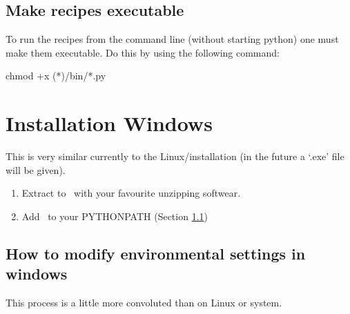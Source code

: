 \subsection{Make recipes executable}
\label{ch:install:installunix:executable}

\noindent To run the recipes from the command line (without starting python) one must make them executable. Do this by using the following command:
\begin{cmdbox}
chmod +x (*\InstallDIR*)/bin/*.py
\end{cmdbox}



\clearpage
\newpage
\section{Installation Windows}
\label{ch:install:install_win}

This is very similar currently to the Linux/\mac installation (in the future a `.exe' file will be given).

\begin{enumerate}
\item Extract to \InstallDIR\, with your favourite unzipping softwear.
\item Add \InstallDIR\, to your PYTHONPATH (Section \ref{ch:install:install_win:environ_settings})
\end{enumerate}

\subsection{How to modify environmental settings in windows}
\label{ch:install:install_win:environ_settings}

This process is a little more convoluted than on Linux or \mac system.

